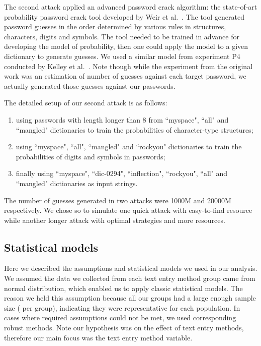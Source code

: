 \documentclass[conference]{IEEEtran}
\begin{document}
The second attack applied an advanced password crack algorithm: the state-of-art probability password crack tool developed by Weir et al.~\cite{Weir:2009:PCU:1607723.1608146, Weir:2010:TMP:1866307.1866327}. The tool generated password guesses in the order determined by various rules in structures, characters, digits and symbols.
The tool needed to be trained in advance for developing the model of probability, then one could apply the model to a given dictionary to generate guesses. We used a similar model from experiment P4 conducted by Kelley et al.~\cite{Kelley:2012:GAM:2310656.2310715}. Note though while the experiment from the original work was an estimation of number of guesses against each target password, we actually generated those guesses against our passwords. 

The detailed setup of our second attack is as follows: 

\begin{enumerate}
\item using passwords with length longer than 8 from ``myspace", ``all" and ``mangled" dictionaries to train the probabilities of character-type structures;
\item using ``myspace", ``all", ``mangled" and ``rockyou" dictionaries to train the probabilities of digits and symbols in passwords;
\item finally using ``myspace", ``dic-0294", ``inflection", ``rockyou", ``all" and ``mangled" dictionaries as input strings.
\end{enumerate}

The number of guesses generated in two attacks were 1000M and 20000M respectively. We chose so to simulate one quick attack with easy-to-find resource while another longer attack with optimal strategies and more resources.

\subsection{Statistical models}

Here we described the assumptions and statistical models we used in our analysis. We assumed the data we collected from each text entry method group came from normal distribution, which enabled us to apply classic statistical models. The reason we held this assumption because all our groups had a large enough sample size ( per group), indicating they were representative for each population. In cases where required assumptions could not be met, we used corresponding robust methods. Note our hypothesis was on the effect of text entry methods, therefore our main focus was the text entry method variable.
\end{document}
